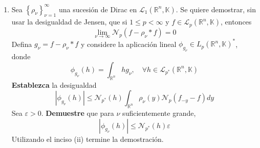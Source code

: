 \documentclass[12pt]{report}
\theoremstyle{largebreak}
\newcommand\abs[1]{\ensuremath{\left|#1\right|}}
\newcommand{\N}[2]{\ensuremath{\mathcal{N}_{#1}\left(#2\right)}}
\begin{document}
\begin{excer}
\begin{enumerate}
            \item Sea $\left\{\rho_\nu \right\}_{\nu=1}^\infty$ una sucesión de Dirac en $\mathcal{L}_1(\mathbb{R}^n,\mathbb{K})$. Se quiere demostrar, sin usar la desigualdad de Jensen, que si $1\leq p<\infty$ y $f\in\mathcal{L}_p(\mathbb{R}^n,\mathbb{K})$, entonces
            \begin{equation*}
                \lim_{\nu\rightarrow\infty}\N{p}{f-\rho_\nu*f}=0
            \end{equation*}
            Defina $g_\nu=f-\rho_\nu*f$ y considere la aplicación lineal $\phi_{g_\nu}\in L_{p}(\mathbb{R}^n,\mathbb{K})^*$, donde
            \begin{equation*}
                \phi_{g_\nu}(h)=\int_{\mathbb{R}^n}hg_\nu,\quad\forall h\in \mathcal{L}_{p^*}(\mathbb{R}^n,\mathbb{K})
            \end{equation*}
            \textbf{Establezca} la desigualdad
            \begin{equation*}
                \abs{\phi_{g_\nu}(h)}\leq\N{p^*}{h}\int_{\mathbb{R}^n}\rho_\nu(y)\N{p}{f_{-y}-f}dy
            \end{equation*}
            Sea $\varepsilon>0$. \textbf{Demuestre} que para $\nu$ suficientemente grande,
            \begin{equation*}
                \abs{\phi_{g_\nu}(h)}\leq\N{p^*}{h}\varepsilon
            \end{equation*}
            Utilizando el inciso (ii) termine la demostración.
        \end{enumerate}
    \end{excer}
\end{document}
